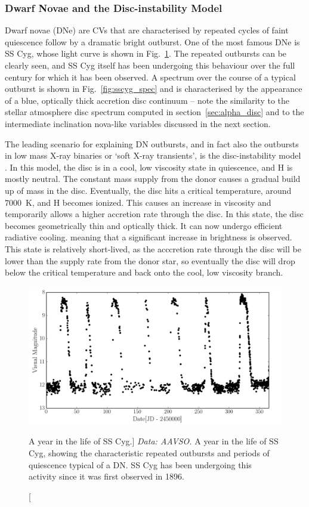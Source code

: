 \subsubsection{Dwarf Novae and the Disc-instability Model}

Dwarf novae (DNe) are CVs that are characterised 
by repeated cycles of faint quiescence follow by a dramatic bright 
outburst. One of the 
most famous DNe is SS Cyg, whose light curve is shown in 
Fig.~\ref{fig:sscyg}. The repeated outbursts can be clearly seen, and
SS Cyg itself has been undergoing this behaviour over the full century 
for which it has been observed. A spectrum over the course of a 
typical outburst is shown in Fig.~\ref{fig:sscyg_spec} 
and is characterised by the appearance of a blue, optically thick
accretion disc continuum -- note the similarity to the 
stellar atmosphere disc spectrum computed in section~\ref{sec:alpha_disc}
and to the intermediate inclination nova-like variables discussed in the next
section.

The leading scenario for explaining DN outbursts, and in fact also the outbursts
in low mass X-ray binaries or `soft X-ray transients',
is the disc-instability model \citep[DIM; ][]{osaki1974,hoshi1979,meyer1981,lasota2001}. 
In this model, the disc is in a cool, low viscosity state in quiescence, 
and H is mostly neutral. The constant mass supply from the donor causes 
a gradual build up of mass in the disc. Eventually, the disc hits a critical 
temperature, around $7000$~K, and H becomes ionized. This causes an increase
in viscosity and temporarily allows a higher accretion rate through the disc.
In this state, the disc becomes geometrically thin and
optically thick. It can now undergo efficient radiative cooling.
meaning that a significant increase in brightness is observed.
This state is relatively short-lived, as the acccretion rate through
the disc will be lower than the supply rate from the donor star, so eventually
the disc will drop below the critical temperature and back onto the cool,
low viscosity branch. 

\begin{figure}
\centering
\includegraphics[width=1.0\textwidth]{figures/01-intro/lc_sscyg.png}
\caption
[A year in the life of SS Cyg.]
{
{\sl Data: AAVSO.} 
A year in the life of SS Cyg, showing the characteristic repeated
outbursts and periods of quiescence typical of a DN. SS Cyg has been
undergoing this activity since it was first observed in 1896.
} 
\label{fig:sscyg}
\end{figure}

